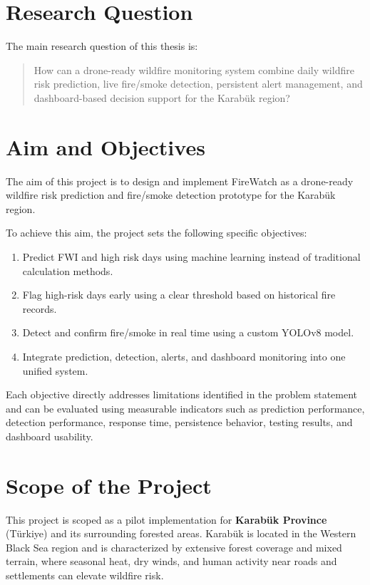 \section{Research Question}

The main research question of this thesis is:

\begin{quote}
How can a drone-ready wildfire monitoring system combine daily wildfire risk
prediction, live fire/smoke detection, persistent alert management, and
dashboard-based decision support for the Karabük region?
\end{quote}

\section{Aim and Objectives}

The aim of this project is to design and implement FireWatch as a drone-ready
wildfire risk prediction and fire/smoke detection prototype for the Karabük
region.

To achieve this aim, the project sets the following specific objectives:

\begin{enumerate}
  \item Predict FWI and high risk days using machine learning instead of traditional calculation methods.
  \item Flag high-risk days early using a clear threshold based on historical fire records.
  \item Detect and confirm fire/smoke in real time using a custom YOLOv8 model.
  \item Integrate prediction, detection, alerts, and dashboard monitoring into one unified system.
\end{enumerate}

Each objective directly addresses limitations identified in the problem
statement and can be evaluated using measurable indicators such as prediction
performance, detection performance, response time, persistence behavior,
testing results, and dashboard usability.

\section{Scope of the Project}

This project is scoped as a pilot implementation for \textbf{Karabük Province}
(Türkiye) and its surrounding forested areas. Karabük is located in the Western
Black Sea region and is characterized by extensive forest coverage and mixed
terrain, where seasonal heat, dry winds, and human activity near roads and
settlements can elevate wildfire risk.


